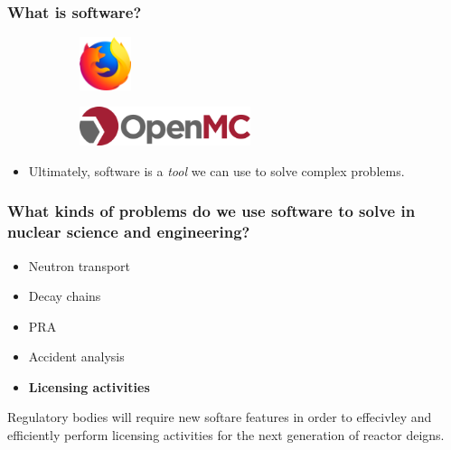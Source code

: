 \begin{frame}
  \frametitle{What is software?}
  \begin{figure}[htpb]
      \centering
      \begin{subfigure}
        \centering
        \includegraphics[width=1.5cm]{images/firefox-logo.png}
      \end{subfigure}
      \hspace{1cm}
      \begin{subfigure}
        \centering
        \includegraphics[width=5cm]{images/openmc-logo.png}
      \end{subfigure}
  \end{figure}
  \pause\medskip
  \begin{itemize}
      \item Ultimately, software is a {\it tool} we can use to solve complex problems.
  \end{itemize}
\end{frame}

\begin{frame}
    \frametitle{What kinds of problems do we use software to solve in nuclear science and engineering?}

    \pause\medskip
    \begin{itemize}
        \item Neutron transport
        \item Decay chains
        \item PRA
        \item Accident analysis
        \item {\bf Licensing activities}
    \end{itemize}

    Regulatory bodies will require new softare features in order to effecivley and efficiently perform licensing activities for the next generation of reactor deigns.
\end{frame}

